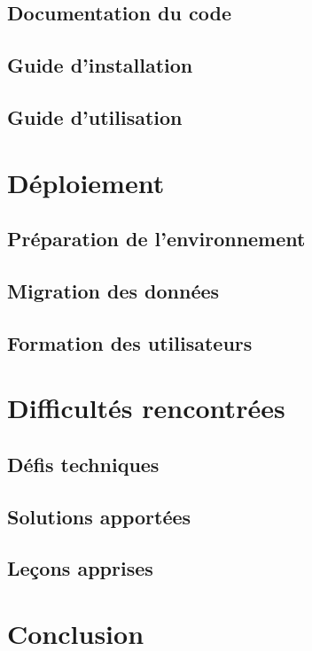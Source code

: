 
\subsection{Documentation du code}


\subsection{Guide d'installation}


\subsection{Guide d'utilisation}


\section{Déploiement}


\subsection{Préparation de l'environnement}


\subsection{Migration des données}


\subsection{Formation des utilisateurs}


\section{Difficultés rencontrées}


\subsection{Défis techniques}


\subsection{Solutions apportées}


\subsection{Leçons apprises}


\section{Conclusion}

